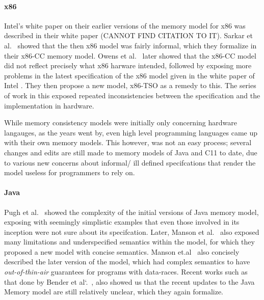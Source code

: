 \paragraph{x86}
Intel's white paper on their earlier versions of the memory model for x86 was described in their white paper (CANNOT FIND CITATION TO IT).   
Sarkar et al.~\cite{SarkarS} showed that the then x86 model was fairly informal, which they formalize in their x86-CC memory model. Owens et al.~\cite{OwensS} later showed that the x86-CC model did not reflect precisely what x86 harware intended, followed by exposing more problems in the latest specification of the x86 model given in the white paper of Intel \cite{IntelW}. They then propose a new model, x86-TSO as a remedy to this. The series of work in this exposed repeated inconsistencies between the specification and the implementation in hardware. 

While memory consistency models were initially only concerning hardware langauges, as the years went by, even high level programming languages came up with their own memory models. 
This however, was not an easy process; several changes and edits are still made to memory models of Java and C11 to date, due to various new concerns about informal/ ill defined specifcations that render the model useless for programmers to rely on. 

\paragraph{Java}
Pugh et al.~\cite{Pugh} showed the complexity of the initial versions of Java memory model, exposing with seemingly simplistic examples that even those involved in its inception were not sure about its specifcation. 
Later, Manson et al.~\cite{JeremyM} also exposed many limitations and underspecified semantics within the model, for which they proposed a new model with concise semantics. 
Manson et.al~\cite{Manson2} also concisely described the later version of the model, which had complex semantics to have \textit{out-of-thin-air} guarantees for programs with data-races. 
Recent works such as that done by Bender et al`.~\cite{BenderJ}, also showed us that the recent updates to the Java Memory model are still relatively unclear, which they again formalize. 

